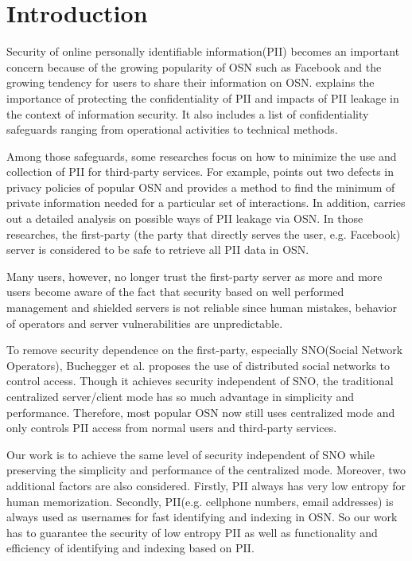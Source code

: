 \documentclass[10pt, conference, compsocconf]{IEEEtran}
\begin{document}
\section{Introduction}
    Security of online personally identifiable information(PII) becomes
    an important concern \cite{lzf1, lzf2} because
    of the growing popularity of OSN such as Facebook\cite{facebook} and
    the growing tendency for users to share their information
    on OSN.
    \cite{guide} explains the importance of protecting the confidentiality of PII
    and impacts of PII leakage in the
    context of information security. It also includes a list of confidentiality
    safeguards ranging from operational activities to technical methods.

    Among those safeguards, some researches focus on how to minimize the use and
    collection of PII for third-party services.
    For example, \cite{charact} points out two defects
    in privacy policies of popular OSN and provides a method to find the minimum
    of private information needed for a particular set of interactions. In addition,
    \cite{leakage} carries out a detailed analysis on possible ways of PII
    leakage via OSN.
    In those researches, the first-party (the party that directly serves the user, e.g. Facebook)
    server is considered to be safe to retrieve all PII data in OSN.

    Many users, however, no longer trust the first-party server
    as more and more users become aware of the fact that security
    based on well performed management and shielded
    servers is not reliable since human mistakes, behavior of operators and server
    vulnerabilities are unpredictable.

    To remove security dependence on the first-party, especially SNO(Social Network Operators),
    Buchegger et al.\cite{lzf3, lzf4} proposes the use of distributed social networks
    to control access.
    Though it achieves security independent of SNO, the traditional centralized server/client
    mode has so much advantage in simplicity and performance. Therefore,
    most popular OSN now still uses centralized mode and only controls PII access from
    normal users and third-party services.

    Our work is to achieve the same level of security independent of SNO while preserving
    the simplicity and performance of the centralized mode. Moreover, two additional factors
    are also considered. Firstly, PII always has very low entropy for human memorization.
    Secondly, PII(e.g. cellphone numbers, email addresses) is always used as usernames
    for fast identifying and indexing in OSN.
    So our work has to guarantee the security of low entropy PII as
    well as functionality and efficiency of identifying and indexing based on PII.
\end{document}
